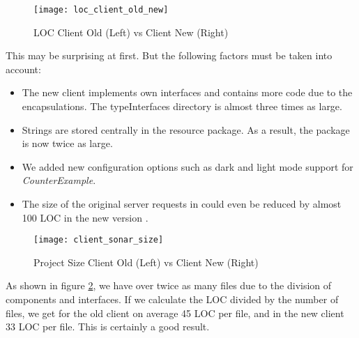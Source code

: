 \begin{figure}[H]
    \centering
    \texttt{[image: loc\_client\_old\_new]}
    \caption{LOC Client Old (Left) vs Client New (Right)}
    \label{fig:loc_client_old_new}
\end{figure}

This may be surprising at first. But the following factors must be taken into account:

\begin{itemize}
    \item The new client implements own interfaces and contains more code due to the encapsulations.
    The typeInterfaces directory is almost three times as large.
    \item Strings are stored centrally in the resource package.
    As a result, the package is now twice as large.
    \item We added new configuration options such as dark and light mode support for \textit{CounterExample}.
    \item The size of the original server requests in 
    could even be reduced by almost 100 LOC in the new version .
\end{itemize}

\begin{figure}[H]
    \centering
    \texttt{[image: client\_sonar\_size]}
    \caption{Project Size Client Old (Left) vs Client New (Right)}
    \label{fig:client_sonar_size}
\end{figure}

As shown in figure \ref{fig:client_sonar_size},
we have over twice as many files due to the division of components and interfaces.
If we calculate the LOC divided by the number of files,
we get for the old client on average 45 LOC per file, and in the new client 33 LOC per file.
This is certainly a good result.

